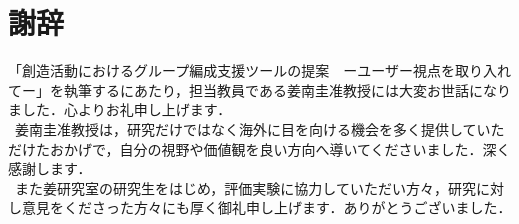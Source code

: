 \documentclass{funthesis}
\begin{document}
\chapter*{謝辞}
「創造活動におけるグループ編成支援ツールの提案　ーユーザー視点を取り入れてー」を執筆するにあたり，担当教員である姜南圭准教授には大変お世話になりました．心よりお礼申し上げます．\\
\ 姜南圭准教授は，研究だけではなく海外に目を向ける機会を多く提供していただけたおかげで，自分の視野や価値観を良い方向へ導いてくださいました．深く感謝します．\\
\ また姜研究室の研究生をはじめ，評価実験に協力していただい方々，研究に対し意見をくださった方々にも厚く御礼申し上げます．ありがとうございました．




\end{document}

